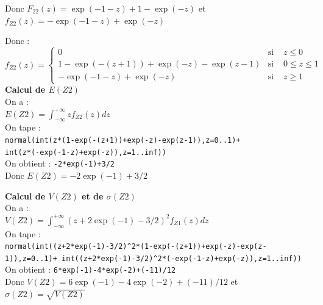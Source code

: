 \documentclass[a4paper,11pt]{book}
\begin{document}
\begin{enumerate}
\begin{enumerate}
\begin{itemize}
Donc $F_{22}(z)=\exp(-1-z)+1-\exp(-z)$ et $f_{Z2}(z)=-\exp(-1-z)+\exp(-z)$
\end{itemize}
Donc :
$$
f_{Z2}(z)=
\left\{
\begin{array}{rll}
0 & \mbox{si }& z\leq 0 \\
1-\exp(-(z+1))+\exp(-z)-\exp(z-1) & \mbox{si }&0\leq z \leq 1\\
-\exp(-1-z)+\exp(-z) & \mbox{si }& z \geq 1
\end{array}
\right.
$$
{\bf Calcul de $E(Z2)$}\\
On a :\\
$\displaystyle E(Z2)=\int_{-\infty}^{+\infty}zf_{Z2}(z)dz$\\
On tape :\\
{\tt normal(int(z*(1-exp(-(z+1))+exp(-z)-exp(z-1)),z=0..1)+\\ int(z*(-exp(-1-z)+exp(-z)),z=1..inf))}\\
On obtient : {\tt -2*exp(-1)+3/2}\\
Donc $E(Z2)=-2\exp(-1)+3/2$

{\bf Calcul de $V(Z2)$ et de $\sigma(Z2)$}\\
On a :\\
$\displaystyle V(Z2)=\int_{-\infty}^{+\infty}(z+2\exp(-1)-3/2)^2f_{Z1}(z)dz$\\
On tape :\\
{\tt normal(int((z+2*exp(-1)-3/2)\verb|^|2*(1-exp(-(z+1))+exp(-z)-exp(z-1)),z=0..1)+ int((z+2*exp(-1)-3/2)\verb|^|2*(-exp(-1-z)+exp(-z)),z=1..inf))}\\
On obtient : {\tt 6*exp(-1)-4*exp(-2)+(-11)/12}\\
Donc $V(Z2)=6\exp(-1)-4\exp(-2)+(-11)/12$ et $\sigma(Z2)=\sqrt{V(Z2)}$


\end{enumerate}
\end{enumerate}
\end{document}
